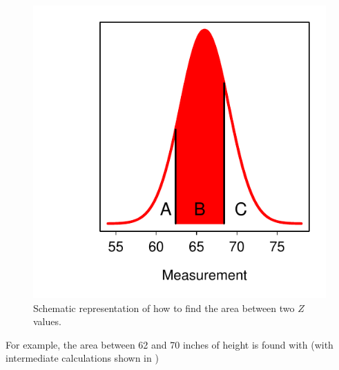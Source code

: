 \documentclass[10pt,openany]{book}\usepackage[]{graphicx}\usepackage[]{color}
\newenvironment{knitrout}{}{} %
\begin{document}
\begin{knitrout}
\color{fgcolor}\begin{figure}[hbtp]

{\centering \includegraphics[width=.4\linewidth]{Figs/NormDistBetween-1} 

}

\caption[Schematic representation of how to find the area between two $Z$ values]{Schematic representation of how to find the area between two $Z$ values.}\label{fig:NormDistBetween}
\end{figure}


\end{knitrout}

For example, the area between 62 and 70 inches of height is found with (with intermediate calculations shown in )
\end{document}
